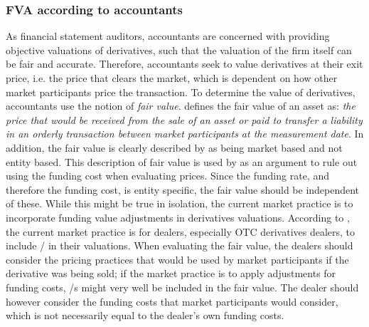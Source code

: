 \documentclass[main.tex]{subfiles}
\begin{document}
        \subsubsection{FVA according to accountants}
            As financial statement auditors, accountants are concerned with providing objective valuations of derivatives,
            such that the valuation of the firm itself can be fair and accurate.
            Therefore, accountants seek to value derivatives at their exit price, i.e. the price that clears the market,
            which is dependent on how other market participants price the transaction.
            To determine the value of derivatives, accountants use the notion of \textit{fair value}.
            \textcite{IFRS13} defines the fair value of an asset as: 
            \textit{the price that would be received from the sale of an asset or paid to transfer a liability
            in an orderly transaction between market participants at the measurement date}.
            In addition, the fair value is clearly described by \textcite{IFRS13} as being market based and not entity based.
            This description of fair value is used by \textcite{HullWhiteFVA} as an argument to
            rule out using the funding cost when evaluating prices.
            Since the funding rate, and therefore the funding cost, is entity specific,
            the fair value should be independent of these.
            While this might be true in isolation, 
            the current market practice is to incorporate funding value adjustments in derivatives valuations.
            According to \textcite{KPMGFVA}, the current market practice is for dealers, especially OTC derivatives dealers,
            to include \FVA/ in their valuations.  
            When evaluating the fair value, the dealers should consider the pricing practices 
            that would be used by market participants if the derivative was being sold;
            if the market practice is to apply adjustments for funding costs,
            \FVA/s might very well be included in the fair value.
            The dealer should however consider the funding costs that market participants would consider,
            which is not necessarily equal to the dealer's own funding costs.
\end{document}
